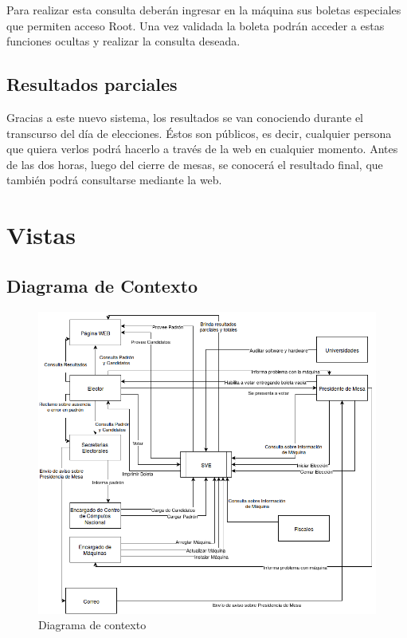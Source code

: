 \documentclass[spanish, 10pt,a4paper]{article}
\numberwithin{equation}{section} %
\begin{document}
	Para realizar esta consulta deberán ingresar en la máquina sus boletas especiales que permiten acceso Root. Una vez validada la boleta podrán acceder a estas funciones ocultas y realizar la consulta deseada. 

\subsection{Resultados parciales}
	Gracias a este nuevo sistema, los resultados se van conociendo durante el transcurso del día de elecciones. Éstos son públicos, es decir, cualquier persona que quiera verlos podrá hacerlo a través de la web en cualquier momento.
	Antes de las dos horas, luego del cierre de mesas, se conocerá el resultado final, que también podrá consultarse mediante la web. 

\section{Vistas}
\subsection{Diagrama de Contexto}

\begin{figure}[H]
  \centering
  \includegraphics[scale=0.50]{pdf/DiagramaDeContexto}
  \caption{Diagrama de contexto}
  \label{fig:DiagramaDeContexto}
\end{figure}
\end{document}
